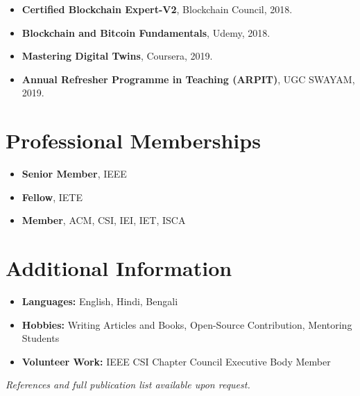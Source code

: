 \documentclass[10pt,a4paper]{article}
\begin{document}
	\begin{itemize}[leftmargin=0.15in]
		\item \textbf{Certified Blockchain Expert-V2}, Blockchain Council, 2018.
		\item \textbf{Blockchain and Bitcoin Fundamentals}, Udemy, 2018.
		\item \textbf{Mastering Digital Twins}, Coursera, 2019.
		\item \textbf{Annual Refresher Programme in Teaching (ARPIT)}, UGC SWAYAM, 2019.
	\end{itemize}
	
	\section*{Professional Memberships}
	
	\begin{itemize}[leftmargin=0.15in]
		\item \textbf{Senior Member}, IEEE
		\item \textbf{Fellow}, IETE
		\item \textbf{Member}, ACM, CSI, IEI, IET, ISCA
	\end{itemize}
	
	\section*{Additional Information}
	
	\begin{itemize}[leftmargin=0.15in]
		\item \textbf{Languages:} English, Hindi, Bengali
		\item \textbf{Hobbies:} Writing Articles and Books, Open-Source Contribution, Mentoring Students
		\item \textbf{Volunteer Work:} IEEE CSI Chapter Council Executive Body Member
	\end{itemize}
	
	\vfill
	
	\begin{center}
		\textit{References and full publication list available upon request.}
	\end{center}
	
\end{document}
